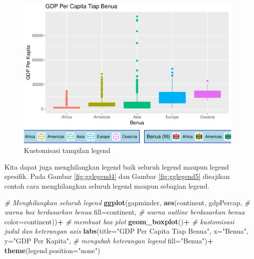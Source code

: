 \documentclass[]{book}
\newenvironment{Shaded}{\begin{snugshade}}{\end{snugshade}}
\newcommand{\KeywordTok}[1]{\textcolor[rgb]{0.13,0.29,0.53}{\textbf{#1}}}
\newcommand{\DataTypeTok}[1]{\textcolor[rgb]{0.13,0.29,0.53}{#1}}
\newcommand{\StringTok}[1]{\textcolor[rgb]{0.31,0.60,0.02}{#1}}
\newcommand{\CommentTok}[1]{\textcolor[rgb]{0.56,0.35,0.01}{\textit{#1}}}
\newcommand{\OperatorTok}[1]{\textcolor[rgb]{0.81,0.36,0.00}{\textbf{#1}}}
\newcommand{\NormalTok}[1]{#1}
\begin{document}
\begin{figure}

{\centering \includegraphics[width=0.7\linewidth]{EnvStat_files/figure-latex/gglegend3-1} 

}

\caption{Kustomisasi tampilan legend}\label{fig:gglegend3}
\end{figure}

Kita dapat juga menghilangkan legend baik seluruh legend maupun legend
spesifik. Pada Gambar \ref{fig:gglegend4} dan Gambar \ref{fig:gglegend5}
disajikan contoh cara menghilangkan seluruh legend maupun sebagian
legend.

\begin{Shaded}
\begin{Highlighting}[]
\CommentTok{# Menghilangkan seluruh legend}
\KeywordTok{ggplot}\NormalTok{(gapminder, }\KeywordTok{aes}\NormalTok{(continent, gdpPercap, }
                      \CommentTok{# warna box berdasarkan benua}
                      \DataTypeTok{fill=}\NormalTok{continent,}
                      \CommentTok{# warna outline berdasarkan benua}
                      \DataTypeTok{color=}\NormalTok{continent))}\OperatorTok{+}
\StringTok{  }\CommentTok{# membuat box plot}
\StringTok{  }\KeywordTok{geom_boxplot}\NormalTok{()}\OperatorTok{+}
\StringTok{  }\CommentTok{# kustomisasi judul dan keterangan axis}
\StringTok{  }\KeywordTok{labs}\NormalTok{(}\DataTypeTok{title=}\StringTok{"GDP Per Capita Tiap Benua"}\NormalTok{,}
       \DataTypeTok{x=}\StringTok{"Benua"}\NormalTok{, }\DataTypeTok{y=}\StringTok{"GDP Per Kapita"}\NormalTok{,}
       \CommentTok{# mengubah keterangan legend}
       \DataTypeTok{fill=}\StringTok{"Benua"}\NormalTok{)}\OperatorTok{+}
\StringTok{  }\KeywordTok{theme}\NormalTok{(}\DataTypeTok{legend.position=}\StringTok{"none"}\NormalTok{)}
\end{Highlighting}
\end{Shaded}
\end{document}
